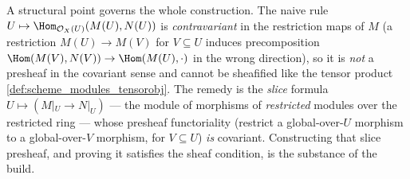 A structural point governs the whole construction. The naive rule
\(U \mapsto \Hom_{\mathcal{O}_X(U)}(M(U), N(U))\) is \emph{contravariant} in the
restriction maps of \(M\) (a restriction \(M(U) \to M(V)\) for \(V \subseteq U\)
induces precomposition \(\Hom(M(V), N(V)) \to \Hom(M(U), \cdot)\) in the wrong
direction), so it is \emph{not} a presheaf in the covariant sense and cannot be
sheafified like the tensor product \cref{def:scheme_modules_tensorobj}. The remedy is
the \emph{slice} formula \(U \mapsto (M|_U \to N|_U)\) --- the module of morphisms of
\emph{restricted} modules over the restricted ring --- whose presheaf functoriality
(restrict a global-over-\(U\) morphism to a global-over-\(V\) morphism, for
\(V \subseteq U\)) \emph{is} covariant. Constructing that slice presheaf, and
proving it satisfies the sheaf condition, is the substance of the build.

